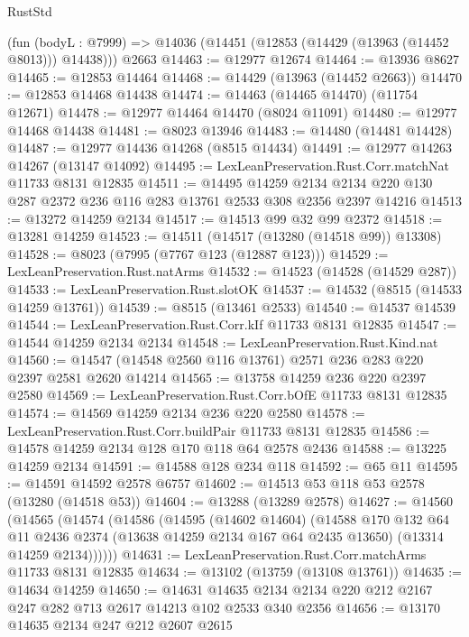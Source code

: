 \begin{lexlean}{RustStd}
\begin{coremodule}
    (fun (bodyL : @7999) => @14036 (@14451 (@12853 (@14429 (@13963 (@14452 @8013))) @14438)))
    @2663
@14463 := @12977 @12674
@14464 := @13936 @8627
@14465 := @12853 @14464
@14468 := @14429 (@13963 (@14452 @2663))
@14470 := @12853 @14468 @14438
@14474 := @14463 (@14465 @14470) (@11754 @12671)
@14478 := @12977 @14464 @14470 (@8024 @11091)
@14480 := @12977 @14468 @14438
@14481 := @8023 @13946
@14483 := @14480 (@14481 @14428)
@14487 := @12977 @14436 @14268 (@8515 @14434)
@14491 := @12977 @14263 @14267 (@13147 @14092)
@14495 := LexLeanPreservation.Rust.Corr.matchNat @11733 @8131 @12835
@14511 := @14495
    @14259
    @2134
    @2134
    @220
    @130
    @287
    @2372
    @236
    @116
    @283
    @13761
    @2533
    @308
    @2356
    @2397
    @14216
@14513 := @13272 @14259 @2134
@14517 := @14513 @99 @32 @99 @2372
@14518 := @13281 @14259
@14523 := @14511 (@14517 (@13280 (@14518 @99)) @13308)
@14528 := @8023 (@7995 (@7767 @123 (@12887 @123)))
@14529 := LexLeanPreservation.Rust.natArms
@14532 := @14523 (@14528 (@14529 @287))
@14533 := LexLeanPreservation.Rust.slotOK
@14537 := @14532 (@8515 (@14533 @14259 @13761))
@14539 := @8515 (@13461 @2533)
@14540 := @14537 @14539
@14544 := LexLeanPreservation.Rust.Corr.kIf @11733 @8131 @12835
@14547 := @14544 @14259 @2134 @2134
@14548 := LexLeanPreservation.Rust.Kind.nat
@14560 := @14547 (@14548 @2560 @116 @13761) @2571 @236 @283 @220 @2397 @2581 @2620 @14214
@14565 := @13758 @14259 @236 @220 @2397 @2580
@14569 := LexLeanPreservation.Rust.Corr.bOfE @11733 @8131 @12835
@14574 := @14569 @14259 @2134 @236 @220 @2580
@14578 := LexLeanPreservation.Rust.Corr.buildPair @11733 @8131 @12835
@14586 := @14578 @14259 @2134 @128 @170 @118 @64 @2578 @2436
@14588 := @13225 @14259 @2134
@14591 := @14588 @128 @234 @118
@14592 := @65 @11
@14595 := @14591 @14592 @2578 @6757
@14602 := @14513 @53 @118 @53 @2578 (@13280 (@14518 @53))
@14604 := @13288 (@13289 @2578)
@14627 := @14560
    (@14565
      (@14574
        (@14586
          (@14595
            (@14602 @14604)
            (@14588
              @170
              @132
              @64
              @11
              @2436
              @2374
              (@13638 @14259 @2134 @167 @64 @2435 @13650)
              (@13314 @14259 @2134))))))
@14631 := LexLeanPreservation.Rust.Corr.matchArms @11733 @8131 @12835
@14634 := @13102 (@13759 (@13108 @13761))
@14635 := @14634 @14259
@14650 := @14631
    @14635
    @2134
    @2134
    @220
    @212
    @2167
    @247
    @282
    @713
    @2617
    @14213
    @102
    @2533
    @340
    @2356
@14656 := @13170 @14635 @2134 @247 @212 @2607 @2615

\end{coremodule}
\end{lexlean}
